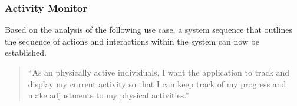 \subsubsection{Activity Monitor}
Based on the analysis of the following use case, a system sequence that outlines the sequence of actions and interactions within the system can now be established.
\begin{quotation}
    \enquote{As an physically active individuals, I want the application to track and display my current activity so that I can keep track of my progress and make adjustments to my physical activities.} 
\end{quotation}




